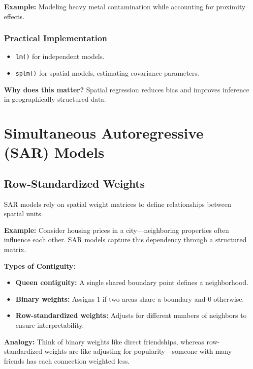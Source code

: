 \documentclass[
  11pt,
]{report}
\providecommand{\tightlist}{%
  \setlength{\itemsep}{0pt}\setlength{\parskip}{0pt}}\usepackage{longtable,booktabs,array}
\begin{document}
\textbf{Example:} Modeling heavy metal contamination while accounting
for proximity effects.

\subsection{Practical Implementation}\label{practical-implementation}

\begin{itemize}
\tightlist
\item
  \texttt{lm()} for independent models.
\item
  \texttt{splm()} for spatial models, estimating covariance parameters.
\end{itemize}

\textbf{Why does this matter?} Spatial regression reduces bias and
improves inference in geographically structured data.

\chapter{Simultaneous Autoregressive (SAR)
Models}\label{simultaneous-autoregressive-sar-models}

\section{Row-Standardized Weights}\label{row-standardized-weights}

SAR models rely on spatial weight matrices to define relationships
between spatial units.

\textbf{Example:} Consider housing prices in a city---neighboring
properties often influence each other. SAR models capture this
dependency through a structured matrix.

\textbf{Types of Contiguity:}

\begin{itemize}
\tightlist
\item
  \textbf{Queen contiguity:} A single shared boundary point defines a
  neighborhood.
\item
  \textbf{Binary weights:} Assigns 1 if two areas share a boundary and 0
  otherwise.
\item
  \textbf{Row-standardized weights:} Adjusts for different numbers of
  neighbors to ensure interpretability.
\end{itemize}

\textbf{Analogy:} Think of binary weights like direct friendships,
whereas row-standardized weights are like adjusting for
popularity---someone with many friends has each connection weighted
less.
\end{document}
